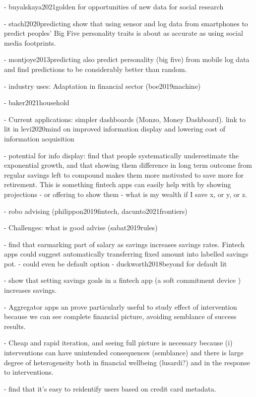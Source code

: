 
- buyalskaya2021golden for opportunities of new data for social research

- stachl2020predicting show that using sensor and log data from smartphones to
predict peoples' Big Five personality traits is about as accurate as using
social media footprints.

- montjoye2013predicting also predict personality (big five) from mobile log
data and find predictions to be considerably better than random.

- industry uses: Adaptation in financial sector (boe2019machine)



- baker2021household



- Current applications: simpler dashboards (Monzo, Money Dashboard). link to
lit in levi2020mind on improved information display and lowering cost of
information acquisition

- potential for info display: \citet{mckenzie2011misunderstanding} find that people systematically
underestimate the exponential growth, and that showing them difference in long
term outcome from regular savings left to compound makes them more motivated to
save more for retirement. This is something fintech apps can easily help with
by showing projections - or offering to show them - what is my wealth if I save
x, or y, or z.

- robo advising (philippon2019fintech, dacunto2021frontiers)

- Challenges: what is good advise (sabat2019rules)

- \citet{soman2011earmarking} find that earmarking part of salary as savings
increases savings rates. Fintech apps could suggest automatically transferring
fixed amount into labelled savings pot.
- could even be default option - duckworth2018beyond for default lit

- \citet{gargano2021goal} show that setting savings goals in a fintech app (a
soft commitment device \citep{beshears2016beyond}) increases savings.


\citet{guttman2021semblance}
- Aggregator apps an prove particularly useful to study effect of intervention
because we can see complete financial picture, avoiding semblance of success
results. 

- Cheap and rapid iteration, and seeing full picture is necessary because (i)
interventions can have unintended consequences (semblance) and there is large
degree of heterogeneity both in financial wellbeing (lusardi?) and in the
response to interventions.




- \citet{demontjoye2015unique} find that it's easy to reidentify users based on
credit card metadata.

